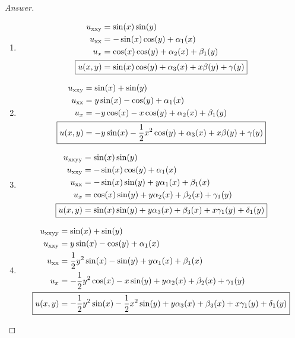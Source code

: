 \documentclass{article}
\theoremstyle{definition}
\renewcommand\qedsymbol{$\blacksquare$}
\newenvironment{ans}{\begin{proof}[Answer]\renewcommand{\qedsymbol}{}}{\end{proof}}
\begin{document}
\begin{ans}
\begin{enumerate}[resume*=answers]
				\item \begin{align*}
					u_{\mathrm{xxy}} &= \sin(x)\sin(y) 
					\\ u_{\mathrm{xx}} &= -\sin(x)\cos(y) + \alpha_1(x)
					\\ u_x &= \cos(x)\cos(y) + \alpha_2(x) + \beta_1(y)
					\\ \Aboxed{u(x,y) &= \sin(x)\cos(y) + \alpha_3(x) + x\beta(y) + \gamma(y)}
				\end{align*}
				
				\item \begin{align*}
					u_{\mathrm{xxy}} &= \sin(x)+\sin(y) 
					\\ u_{\mathrm{xx}} &= y\sin(x) - \cos(y) + \alpha_1(x)
					\\ u_x &= -y\cos(x) - x\cos(y) + \alpha_2(x) + \beta_1(y)
					\\ \Aboxed{u(x,y) &= -y\sin(x) - \frac{1}{2}x^2\cos(y) + \alpha_3(x) + x\beta(y) + \gamma(y)}
				\end{align*}
				
				\item \begin{align*}
					u_{\mathrm{xxyy}} &= \sin(x)\sin(y) 
					\\ u_{\mathrm{xxy}} &= -\sin(x)\cos(y) + \alpha_1(x)
					\\ u_{\mathrm{xx}} &= -\sin(x)\sin(y) + y\alpha_1(x) + \beta_1(x)
					\\ u_x &= \cos(x)\sin(y) + y\alpha_2(x) + \beta_2(x) + \gamma_1(y)
					\\ \Aboxed{u(x,y) &= \sin(x)\sin(y) + y\alpha_3(x) + \beta_3(x) + x\gamma_1(y) + \delta_1(y)}
				\end{align*}
				
				\item \begin{align*}
					u_{\mathrm{xxyy}} &= \sin(x)+\sin(y) 
					\\ u_{\mathrm{xxy}} &= y\sin(x) - \cos(y) + \alpha_1(x)
					\\ u_{\mathrm{xx}} &= \frac{1}{2}y^2\sin(x) - \sin(y) + y\alpha_1(x) + \beta_1(x)
					\\ u_x &= -\frac{1}{2}y^2\cos(x) - x\sin(y) + y\alpha_2(x) + \beta_2(x) + \gamma_1(y)
					\\ \Aboxed{u(x,y) &= -\frac{1}{2}y^2\sin(x) - \frac{1}{2}x^2\sin(y) + y\alpha_3(x) + \beta_3(x) + x\gamma_1(y) +\delta_1(y)}
				\end{align*}
				

\end{enumerate}
\end{ans}
\end{document}
